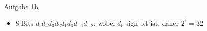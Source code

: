 \begin{frame}{Aufgabe 1b}
    \begin{Sidenote}
        \begin{itemize}
          \item $8$ Bits $d_5 d_4 d_3 d_2 d_1 d_0 d_{-1} d_{-2}$, wobei $d_5$ sign bit ist, daher $2^5 = 32$
        \end{itemize}
    \end{Sidenote}
\end{frame}
